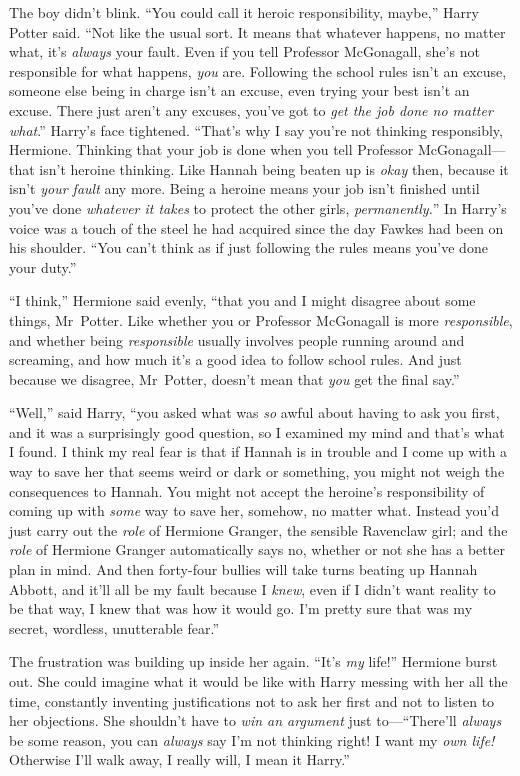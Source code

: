 The boy didn’t blink. “You could call it heroic responsibility, maybe,” Harry Potter said. “Not like the usual sort. It means that whatever happens, no matter what, it’s \emph{always} your fault. Even if you tell Professor McGonagall, she’s not responsible for what happens, \emph{you} are. Following the school rules isn’t an excuse, someone else being in charge isn’t an excuse, even trying your best isn’t an excuse. There just aren’t any excuses, you’ve got to \emph{get the job done no matter what}.” Harry’s face tightened. “That’s why I say you’re not thinking responsibly, Hermione. Thinking that your job is done when you tell Professor McGonagall—that isn’t heroine thinking. Like Hannah being beaten up is \emph{okay} then, because it isn’t \emph{your fault} any more. Being a heroine means your job isn’t finished until you’ve done \emph{whatever it takes} to protect the other girls, \emph{permanently.}” In Harry’s voice was a touch of the steel he had acquired since the day Fawkes had been on his shoulder. “You can’t think as if just following the rules means you’ve done your duty.”

“I think,” Hermione said evenly, “that you and I might disagree about some things, Mr~Potter. Like whether you or Professor McGonagall is more \emph{responsible}, and whether being \emph{responsible} usually involves people running around and screaming, and how much it’s a good idea to follow school rules. And just because we disagree, Mr~Potter, doesn’t mean that \emph{you} get the final say.”

“Well,” said Harry, “you asked what was \emph{so} awful about having to ask you first, and it was a surprisingly good question, so I examined my mind and that’s what I found. I think my real fear is that if Hannah is in trouble and I come up with a way to save her that seems weird or dark or something, you might not weigh the consequences to Hannah. You might not accept the heroine’s responsibility of coming up with \emph{some} way to save her, somehow, no matter what. Instead you’d just carry out the \emph{role} of Hermione Granger, the sensible Ravenclaw girl; and the \emph{role} of Hermione Granger automatically says no, whether or not she has a better plan in mind. And then forty-four bullies will take turns beating up Hannah Abbott, and it’ll all be my fault because I \emph{knew}, even if I didn’t want reality to be that way, I knew that was how it would go. I’m pretty sure that was my secret, wordless, unutterable fear.”

The frustration was building up inside her again. “It’s \emph{my} life!” Hermione burst out. She could imagine what it would be like with Harry messing with her all the time, constantly inventing justifications not to ask her first and not to listen to her objections. She shouldn’t have to \emph{win an argument} just to—“There’ll \emph{always} be some reason, you can \emph{always} say I’m not thinking right! I want my \emph{own life!} Otherwise I’ll walk away, I really will, I mean it Harry.”

